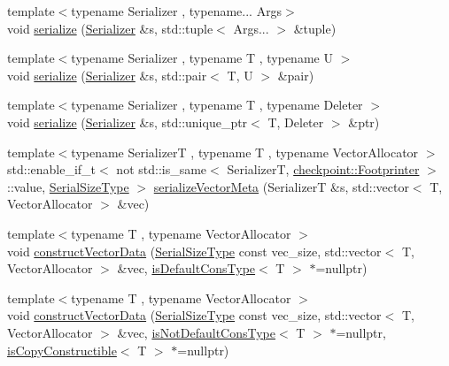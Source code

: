 \begin{DoxyCompactItemize}
\item 
{\footnotesize template$<$typename Serializer , typename... Args$>$ }\\void \hyperlink{namespacecheckpoint_a7ac21fa6ad08fd64a47c789c32966019}{serialize} (\hyperlink{structcheckpoint_1_1_serializer}{Serializer} \&s, std\+::tuple$<$ Args... $>$ \&tuple)
\item 
{\footnotesize template$<$typename Serializer , typename T , typename U $>$ }\\void \hyperlink{namespacecheckpoint_a7b5c3ff67d3f7b65cfb46da7617e87ad}{serialize} (\hyperlink{structcheckpoint_1_1_serializer}{Serializer} \&s, std\+::pair$<$ T, U $>$ \&pair)
\item 
{\footnotesize template$<$typename Serializer , typename T , typename Deleter $>$ }\\void \hyperlink{namespacecheckpoint_a617341cb0473cbdce921a3a4d049f4fc}{serialize} (\hyperlink{structcheckpoint_1_1_serializer}{Serializer} \&s, std\+::unique\+\_\+ptr$<$ T, Deleter $>$ \&ptr)
\item 
{\footnotesize template$<$typename SerializerT , typename T , typename Vector\+Allocator $>$ }\\std\+::enable\+\_\+if\+\_\+t$<$ not std\+::is\+\_\+same$<$ SerializerT, \hyperlink{structcheckpoint_1_1_footprinter}{checkpoint\+::\+Footprinter} $>$\+::value, \hyperlink{namespacecheckpoint_a083f6674da3f94c2901b18c6d238217c}{Serial\+Size\+Type} $>$ \hyperlink{namespacecheckpoint_a1f197f1929607e9e28b3d33993196729}{serialize\+Vector\+Meta} (SerializerT \&s, std\+::vector$<$ T, Vector\+Allocator $>$ \&vec)
\item 
{\footnotesize template$<$typename T , typename Vector\+Allocator $>$ }\\void \hyperlink{namespacecheckpoint_a74da9a404a365bb8b0e4f387dbccc18c}{construct\+Vector\+Data} (\hyperlink{namespacecheckpoint_a083f6674da3f94c2901b18c6d238217c}{Serial\+Size\+Type} const vec\+\_\+size, std\+::vector$<$ T, Vector\+Allocator $>$ \&vec, \hyperlink{namespacecheckpoint_a58224a3b056d9e2aa73d563871981a7d}{is\+Default\+Cons\+Type}$<$ T $>$ $\ast$=nullptr)
\item 
{\footnotesize template$<$typename T , typename Vector\+Allocator $>$ }\\void \hyperlink{namespacecheckpoint_a07ac5236be7239b0aa42aa419f514062}{construct\+Vector\+Data} (\hyperlink{namespacecheckpoint_a083f6674da3f94c2901b18c6d238217c}{Serial\+Size\+Type} const vec\+\_\+size, std\+::vector$<$ T, Vector\+Allocator $>$ \&vec, \hyperlink{namespacecheckpoint_a4032c86e7c92702198dd675a2696ee2c}{is\+Not\+Default\+Cons\+Type}$<$ T $>$ $\ast$=nullptr, \hyperlink{namespacecheckpoint_a60a9850fa59d4b236b2f888baf135a95}{is\+Copy\+Constructible}$<$ T $>$ $\ast$=nullptr)

\end{DoxyCompactItemize}
